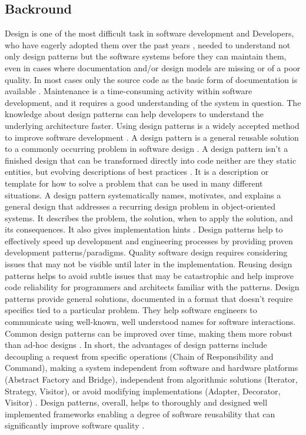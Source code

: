 \documentclass[sigplan,12pt,nonacm=true,review=false]{acmart}
\begin{document}
\subsection{Backround}
Design is one of the most difficult task in software development \cite{hasheminejad_design_2012} and Developers, who have eagerly adopted them over the past years \cite{wendorff_assessment_2001}, needed to understand not only design patterns \cite{riehle_understanding_1996} but the software systems before they can maintain them, even in cases where documentation and/or design models are missing or of a poor quality. In most cases only the source code as the basic form of documentation is available \cite{streitferdt_searching_2005}. Maintenance is a time-consuming activity within software development, and it requires a good understanding of the system in question. The knowledge about design patterns can help developers to understand the underlying architecture faster. Using design patterns is a widely accepted method to improve software development \cite{hahsler_quantitative_2003}.
A design pattern is a general reusable solution to a commonly occurring \cite{hussain_software_2017} problem in software design \cite{antoniol_object-oriented_2001, coplien_software_1998, noauthor, noauthor_design_nodate-6}. A design pattern isn't a finished design that can be transformed directly into code neither are they static entities, but evolving descriptions of best practices \cite{heer_software_2006}. It is a description or template for how to solve a problem that can be used in many different situations. A design pattern systematically names, motivates, and explains a general design that addresses a recurring design problem in object-oriented systems. It describes the problem, the solution, when to apply the solution, and its consequences. It also gives implementation hints \cite{noauthor_design_2015, schaffer_round-trip_1999}.
Design patterns help to effectively speed up development and engineering processes by providing proven development patterns/paradigms. Quality software design requires considering issues that may not be visible until later in the implementation. Reusing design patterns helps to avoid subtle issues that may be catastrophic and help improve code reliability for programmers and architects familiar with the patterns. 
Design patterns provide general solutions, documented in a format that doesn't require specifics tied to a particular problem. They help software engineers to communicate using well-known, well understood names for software interactions. Common design patterns can be improved over time, making them more robust than ad-hoc designs \cite{noauthor_design_nodate, schmidt_software_1996}. In short, the advantages of design patterns include decoupling a request from specific operations (Chain of Responsibility and Command), making a system independent from software and hardware platforms (Abstract Factory and Bridge), independent from algorithmic solutions (Iterator, Strategy, Visitor), or avoid modifying implementations (Adapter, Decorator, Visitor) \cite{aversano_empirical_2007}. Design patterns, overall, helps to thoroughly and designed well implemented frameworks enabling a degree of software reusability that can significantly improve software quality \cite{pree_design_1997, zhang_what_2012, }.
\end{document}
